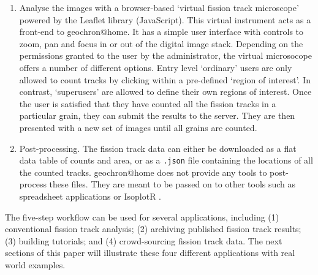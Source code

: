 \documentclass[gchron, manuscript]{copernicus}
\begin{document}
\begin{enumerate}
\item Analyse the images with a browser-based `virtual fission track
  microscope' powered by the Leaflet library (JavaScript). This
  virtual instrument acts as a front-end to geochron@home. It has a
  simple user interface with controls to zoom, pan and focus in or out
  of the digital image stack. Depending on the permissions granted to
  the user by the administrator, the virtual microsocope offers a
  number of different options.  Entry level `ordinary' users are only
  allowed to count tracks by clicking within a pre-defined `region of
  interest'. In contrast, `superusers' are allowed to define their own
  regions of interest. Once the user is satisfied that they have
  counted all the fission tracks in a particular grain, they can
  submit the results to the server. They are then presented with a new
  set of images until all grains are counted.

\item Post-processing. The fission track data can either be downloaded
  as a flat data table of counts and area, or as a \texttt{.json} file
  containing the locations of all the counted tracks. geochron@home
  does not provide any tools to post-process these files. They are
  meant to be passed on to other tools such as spreadsheet
  applications or IsoplotR \citep{vermeesch2018c}.
  
\end{enumerate}
  
The five-step workflow can be used for several applications, including
(1) conventional fission track analysis; (2) archiving published
fission track results; (3) building tutorials; and (4) crowd-sourcing
fission track data. The next sections of this paper will illustrate
these four different applications with real world examples.\medskip
\end{document}
